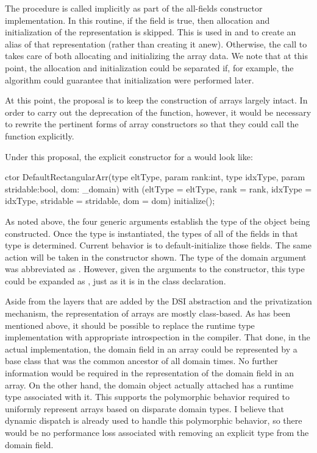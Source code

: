 The  procedure is called implicitly as part of the all-fields
constructor implementation.  In this routine, if the field  is true,
then allocation and initialization of the  representation is skipped.  This
is used in  and  to create an alias of that representation
(rather than creating it anew).  Otherwise, the call to  takes care
of both allocating and initializing the array data.  We note that at this point, the
allocation and initialization could be separated if, for example, the algorithm could
guarantee that initialization were performed later.

At this point, the proposal is to keep the construction of arrays largely intact.  In
order to carry out the deprecation of the  function, however, it would be
necessary to rewrite the pertinent forms of array constructors so that they could call the
 function explicitly.  

Under this proposal, the explicit constructor for a  would
look like:
\begin{chapel}
  ctor DefaultRectangularArr(type eltType, param rank:int, type idxType,
                             param stridable:bool, dom: _domain)
    with (eltType = eltType, rank = rank, idxType = idxType,
          stridable = stridable, dom = dom) {
      initialize();
    }
\end{chapel}
\noindent
As noted above, the four generic arguments establish the type of the object being
constructed.  Once the type is instantiated, the types of all of the fields in that type
is determined.  Current behavior is to default-initialize those fields.  The same action
will be taken in the constructor shown.  The type of the domain argument was abbreviated
as .  However, given the arguments to the constructor, this type could be
expanded as ,
just as it is in the class declaration.

Aside from the layers that are added by the DSI abstraction and the privatization
mechanism, the representation of arrays are mostly class-based.  As has been mentioned
above, it should be possible to replace the runtime type implementation with appropriate
introspection in the compiler.  That done, in the actual implementation, the domain field
in an array could be represented by a base class that was the common ancestor of all
domain times.  No further information would be required in the representation of the
domain field in an array.  On the other hand, the domain object actually attached has a
runtime type associated with it.  This supports the polymorphic behavior required to
uniformly represent arrays based on disparate domain types.  I believe that dynamic
dispatch is already used to handle this polymorphic behavior, so there would be no
performance loss associated with removing an explicit type from the domain field.

